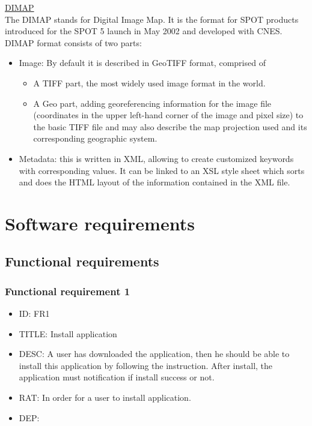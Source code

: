 \documentclass[11pt]{article}
\begin{document}
\noindent \underline{DIMAP}\\
The DIMAP stands for Digital Image Map. It is the format for SPOT products introduced for the SPOT 5 launch in May 2002 and developed with CNES.\footnotemark \\
DIMAP format consists of two parts:\footnotemark[\value{footnote}]
\begin{itemize}
\item Image: By default it is described in GeoTIFF format, comprised of
\begin{itemize}
\item A TIFF part, the most widely used image format in the world.
\item A Geo part, adding georeferencing information for the image file (coordinates in the upper left-hand corner of the image and pixel size) to the basic TIFF file and may also describe the map projection used and its corresponding geographic system.
\end{itemize}
\item Metadata: this is written in XML, allowing to create customized keywords with corresponding values. It can be linked to an XSL style sheet which sorts and does the HTML layout of the information contained in the XML file.
\end{itemize}

\section{Software requirements}
\subsection{Functional requirements}
\subsubsection{Functional requirement 1}
\begin{itemize}
\item ID: FR1
\item TITLE: Install application
\item DESC: A user has downloaded the application, then he should be able to install this application by following the instruction.  After install, the application must notification if install success or not.
\item RAT: In order for a user to install application.
\item DEP: 
\end{itemize}
\end{document}
